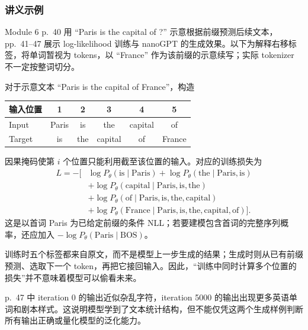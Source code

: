\subsubsection*{讲义示例}

Module 6 p.~40 用 ``Paris is the capital of ?'' 示意根据前缀预测后续文本，pp.~41--47 展示 log-likelihood 训练与 nanoGPT 的生成效果。以下为解释右移标签，将单词暂视为 tokens，以 ``France'' 作为该前缀的示意续写；实际 tokenizer 不一定按整词切分。

\begin{workedsolution}
对于示意文本 ``Paris is the capital of France''，构造
\begin{center}
\begin{tabular}{@{}lccccc@{}}
  \toprule
  输入位置 & 1 & 2 & 3 & 4 & 5 \\
  \midrule
  Input & Paris & is & the & capital & of \\
  Target & is & the & capital & of & France \\
  \bottomrule
\end{tabular}
\end{center}
因果掩码使第 $i$ 个位置只能利用截至该位置的输入。对应的训练损失为
\begin{align*}
  L=-\bigl[&\log P_\theta(\mathrm{is}\mid\mathrm{Paris})
    +\log P_\theta(\mathrm{the}\mid\mathrm{Paris,is})\\
    &+\log P_\theta(\mathrm{capital}\mid\mathrm{Paris,is,the})\\
    &+\log P_\theta(\mathrm{of}\mid\mathrm{Paris,is,the,capital})\\
    &+\log P_\theta(\mathrm{France}\mid\mathrm{Paris,is,the,capital,of})\bigr].
\end{align*}
这是以首词 Paris 为已给定前缀的条件 NLL；若要建模包含首词的完整序列概率，还应加入 $-\log P_\theta(\mathrm{Paris}\mid\mathrm{BOS})$。

训练时五个标签都来自原文，而不是模型上一步生成的结果；生成时则从已有前缀预测、选取下一个 token，再把它接回输入。因此，“训练中同时计算多个位置的损失”并不意味着模型可以偷看未来。

p.~47 中 iteration 0 的输出近似杂乱字符，iteration 5000 的输出出现更多英语单词和剧本样式。这说明模型学到了文本统计结构，但不能仅凭这两个生成样例判断所有输出正确或量化模型的泛化能力。
\end{workedsolution}
